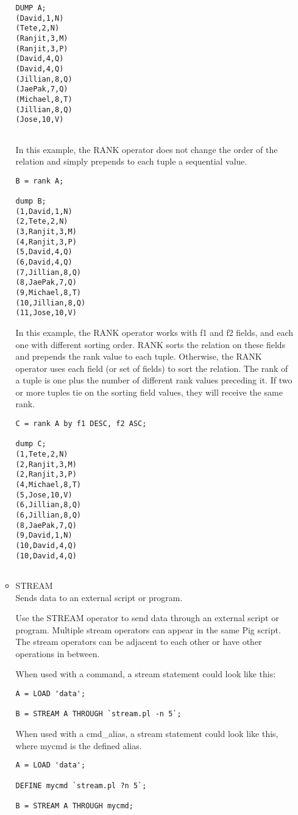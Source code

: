 \documentclass[12pt]{article}
\begin{document}
\begin{itemize}
\begin{itemize}
\begin{lstlisting}
DUMP A;
(David,1,N)
(Tete,2,N)
(Ranjit,3,M)
(Ranjit,3,P)
(David,4,Q)
(David,4,Q)
(Jillian,8,Q)
(JaePak,7,Q)
(Michael,8,T)
(Jillian,8,Q)
(Jose,10,V)
            
				\end{lstlisting}
				In this example, the RANK operator does not change the order of the relation and simply prepends to each tuple a sequential value.
				\begin{lstlisting}
B = rank A;

dump B;
(1,David,1,N)
(2,Tete,2,N)
(3,Ranjit,3,M)
(4,Ranjit,3,P)
(5,David,4,Q)
(6,David,4,Q)
(7,Jillian,8,Q)
(8,JaePak,7,Q)
(9,Michael,8,T)
(10,Jillian,8,Q)
(11,Jose,10,V)
				\end{lstlisting}
				In this example, the RANK operator works with f1 and f2 fields, and each one with different sorting order. RANK sorts the relation on these fields and prepends the rank value to each tuple. Otherwise, the RANK operator uses each field (or set of fields) to sort the relation. The rank of a tuple is one plus the number of different rank values preceding it. If two or more tuples tie on the sorting field values, they will receive the same rank.
				\begin{lstlisting}
C = rank A by f1 DESC, f2 ASC;
                                
dump C;
(1,Tete,2,N)
(2,Ranjit,3,M)
(2,Ranjit,3,P)
(4,Michael,8,T)
(5,Jose,10,V)
(6,Jillian,8,Q)
(6,Jillian,8,Q)
(8,JaePak,7,Q)
(9,David,1,N)
(10,David,4,Q)
(10,David,4,Q)                
            
				\end{lstlisting}
				
				\item STREAM \\
				Sends data to an external script or program.
				
				Use the STREAM operator to send data through an external script or program. Multiple stream operators can appear in the same Pig script. The stream operators can be adjacent to each other or have other operations in between.

When used with a command, a stream statement could look like this:
			\begin{lstlisting}
A = LOAD 'data';

B = STREAM A THROUGH `stream.pl -n 5`;
			\end{lstlisting}
			When used with a cmd\_alias, a stream statement could look like this, where mycmd is the defined alias.
			\begin{lstlisting}
A = LOAD 'data';

DEFINE mycmd `stream.pl ?n 5`;

B = STREAM A THROUGH mycmd;
			\end{lstlisting}			
			\end{itemize}		
		
	
	\end{itemize}
	
\end{document}
